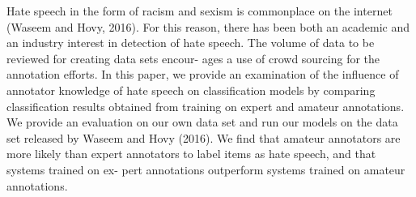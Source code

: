 Hate speech in the form of racism and sexism is commonplace on the internet (Waseem and Hovy, 2016). For this reason, there has been both an academic and an industry interest in detection of hate speech. The volume of data to be reviewed for creating data sets encour- ages a use of crowd sourcing for the annotation efforts. In this paper, we provide an examination of the influence of annotator knowledge of hate speech on classification models by comparing classification results obtained from training on expert and amateur annotations. We provide an evaluation on our own data set and run our models on the data set released by Waseem and Hovy (2016). We find that amateur annotators are more likely than expert annotators to label items as hate speech, and that systems trained on ex- pert annotations outperform systems trained on amateur annotations.
